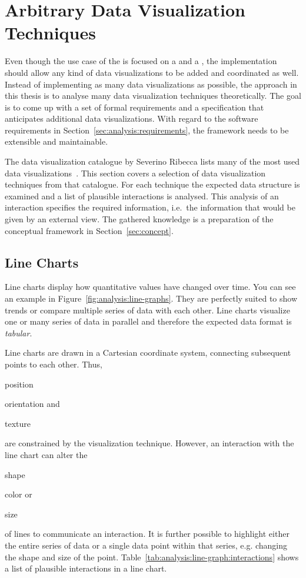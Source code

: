 \section{Arbitrary Data Visualization Techniques}\label{sec:analysis:examples}

Even though the use case of the \cmv{} is focused on a \tmap{} and a \gv{}, the implementation should allow any kind of data visualizations to be added and coordinated as well.
Instead of implementing as many data visualizations as possible, the approach in this thesis is to analyse many data visualization techniques theoretically.
The goal is to come up with a set of formal requirements and a specification that anticipates additional data visualizations.
With regard to the software requirements in Section~\ref{sec:analysis:requirements}, the \cmv{} framework needs to be extensible and maintainable.

The data visualization catalogue by Severino Ribecca lists many of the most used data visualizations~\parencite{VisualizationCatalogue2017}.
This section covers a selection of data visualization techniques from that catalogue.
For each technique the expected data structure is examined and a list of plausible interactions is analysed.
This analysis of an interaction specifies the required information, i.e.\ the information that would be given by an external view.
The gathered knowledge is a preparation of the conceptual framework in Section~\ref{sec:concept}.

\subsection{Line Charts}

Line charts display how quantitative values have changed over time.
You can see an example in Figure~\ref{fig:analysis:line-graphs}.
They are perfectly suited to show trends or compare multiple series of data with each other.
Line charts visualize one or many series of data in parallel and therefore the expected data format is \emph{tabular}.

Line charts are drawn in a Cartesian coordinate system, connecting subsequent points to each other.
Thus,
\begin{enumerate*}[label=(\arabic*)]
    \item position
    \item orientation and
    \item texture
\end{enumerate*}
are constrained by the visualization technique.
However, an interaction with the line chart can alter the
\begin{enumerate*}[label=(\arabic*)]
    \item shape
    \item color or
    \item size
\end{enumerate*}
of lines to communicate an interaction.
It is further possible to highlight either the entire series of data or a single data point within that series, e.g. changing the shape and size of the point.
Table~\ref{tab:analysis:line-graph:interactions} shows a list of plausible interactions in a line chart.


